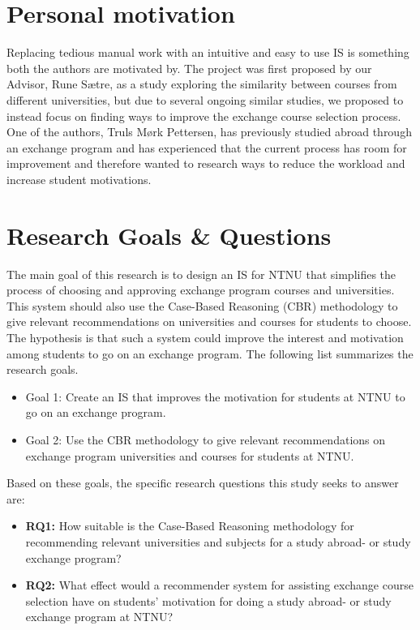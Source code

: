 \section{Personal motivation}
Replacing tedious manual work with an intuitive and easy to use IS is something both the authors are motivated by. The project was first proposed by our Advisor, Rune Sætre, as a study exploring the similarity between courses from different universities, but due to several ongoing similar studies, we proposed to instead focus on finding ways to improve the exchange course selection process. One of the authors, Truls Mørk Pettersen, has previously studied abroad through an exchange program and has experienced that the current process has room for improvement and therefore wanted to research ways to reduce the workload and increase student motivations.

\section{Research Goals \& Questions}\label{RQ}
The main goal of this research is to design an IS for NTNU that simplifies the process of choosing and approving exchange program courses and universities. This system should also use the Case-Based Reasoning (CBR) methodology to give relevant recommendations on universities and courses for students to choose. The hypothesis is that such a system could improve the interest and motivation among students to go on an exchange program. The following list summarizes the research goals.

\begin{itemize}[noitemsep]
    \item Goal 1: Create an IS that improves the motivation for students at NTNU to go on an exchange program.
    \item Goal 2: Use the CBR methodology to give relevant recommendations on exchange program universities and courses for students at NTNU.
\end{itemize}

Based on these goals, the specific research questions this study seeks to answer are:

\begin{itemize}
    \item \textbf{RQ1:} How suitable is the Case-Based Reasoning methodology for recommending relevant universities and subjects for a study abroad- or study exchange program?
    \item \textbf{RQ2:} What effect would a recommender system for assisting exchange course selection have on students' motivation for doing a study abroad- or study exchange program at NTNU?
\end{itemize}


